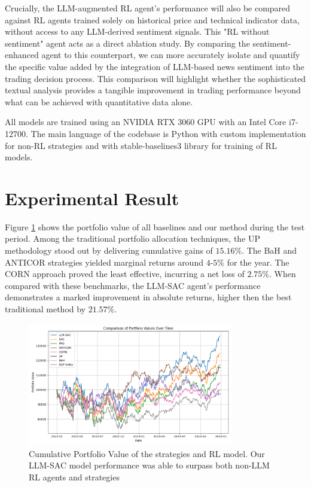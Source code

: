 Crucially, the \gls{LLM}-augmented \gls{RL} agent's performance will also be compared against RL agents trained solely on historical price and technical indicator data, without access to any \gls{LLM}-derived sentiment signals. This "RL without sentiment" agent acts as a direct ablation study. By comparing the sentiment-enhanced agent to this counterpart, we can more accurately isolate and quantify the specific value added by the integration of \gls{LLM}-based news sentiment into the trading decision process. This comparison will highlight whether the sophisticated textual analysis provides a tangible improvement in trading performance beyond what can be achieved with quantitative data alone.

All models are trained using an NVIDIA RTX 3060 GPU with an Intel Core i7-12700. The main language of the codebase is Python with custom implementation for non-\gls{RL} strategies and with stable-baselines3 library for training of \gls{RL} models.

\section{Experimental Result}
Figure \ref{fig:portfolio_value} shows the portfolio value of all baselines and our method during the test period. Among the traditional portfolio allocation techniques, the \gls{UP} methodology stood out by delivering cumulative gains of \(15.16\%\). The \gls{BaH} and \gls{ANTICOR} strategies yielded marginal returns around \(4\)-\(5\%\) for the year. The CORN approach proved the least effective, incurring a net loss of \(2.75\%\). When compared with these benchmarks, the LLM‑SAC agent’s performance demonstrates a marked improvement in absolute returns, higher then the best traditional method by \(21.57\%\).

\begin{figure}
  \centering
    \includegraphics[width=0.8\textwidth]{images/CPV_plot.png}
    \caption{Cumulative Portfolio Value of the strategies and RL model. Our LLM-SAC model performance was able to surpass both non-LLM RL agents and strategies}
    \label{fig:portfolio_value}
\end{figure}

